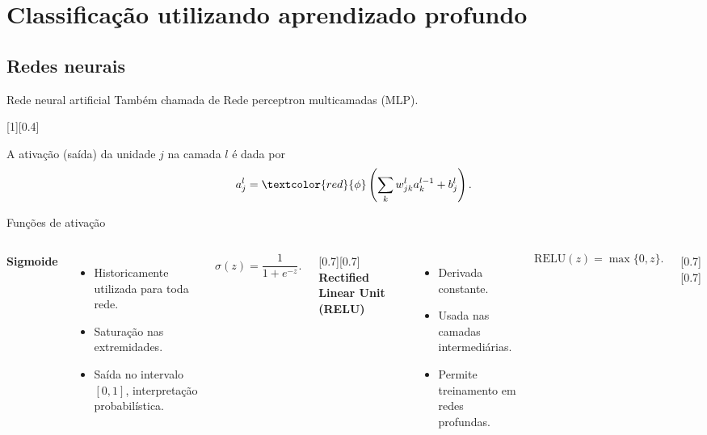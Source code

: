 \section{Classificação utilizando aprendizado profundo}

\subsection{Redes neurais}

\begin{frame}{Rede neural artificial}
	Também chamada de Rede perceptron multicamadas (MLP).

	[0.4]

	A ativação (saída) da unidade $j$ na camada $l$ é dada por
	\begin{equation}
	a^l_j = \textcolor{red}{\phi} \left( \sum_k w_{jk}^l a_k^{l-1} + b_j^l \right).
	\end{equation}
\end{frame}

\begin{frame}{Funções de ativação}
	\begin{columns}[T]
		\textbf{Sigmoide}		
		\begin{itemize}
			\item Historicamente utilizada para toda rede.
			\item Saturação nas extremidades.
			\item Saída no intervalo $[0,1]$, interpretação probabilística.
		\end{itemize}

		\begin{equation*}
		\sigma(z) = \frac{1}{1+e^{-z}}.
		\end{equation*}

		[0.7][0.7]
		\textbf{Rectified Linear Unit (RELU)}
		\begin{itemize}
			\item Derivada constante.
			\item Usada nas camadas intermediárias.
			\item Permite treinamento em redes profundas.
		\end{itemize}

		\begin{equation*}
			\text{RELU}(z) = \max\{0,z\}.
		\end{equation*}

		[0.7][0.7]
	\end{columns}
\end{frame}

